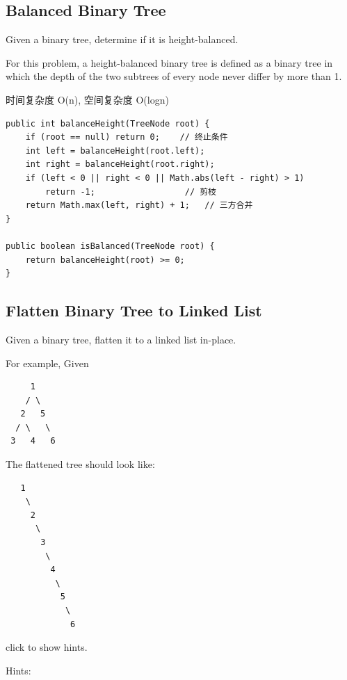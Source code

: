 \documentclass[12pt]{book}
\begin{document}
\subsection{Balanced Binary Tree}
\label{sec-4-2-10}
Given a binary tree, determine if it is height-balanced.

For this problem, a height-balanced binary tree is defined as a binary tree in which the depth of the two subtrees of every node never differ by more than 1.

时间复杂度 O(n), 空间复杂度 O(logn)

\lstset{language=java,label= ,caption= ,numbers=none}
\begin{lstlisting}
public int balanceHeight(TreeNode root) {
    if (root == null) return 0;    // 终止条件
    int left = balanceHeight(root.left);
    int right = balanceHeight(root.right);
    if (left < 0 || right < 0 || Math.abs(left - right) > 1)
        return -1;                  // 剪枝
    return Math.max(left, right) + 1;   // 三方合并
}
        
public boolean isBalanced(TreeNode root) {
    return balanceHeight(root) >= 0;
}
\end{lstlisting}

\subsection{Flatten Binary Tree to Linked List}
\label{sec-4-2-11}
Given a binary tree, flatten it to a linked list in-place.

For example, Given
\lstset{language=java,label= ,caption= ,numbers=none}
\begin{lstlisting}
     1
    / \
   2   5
  / \   \
 3   4   6
\end{lstlisting}

The flattened tree should look like:
\lstset{language=java,label= ,caption= ,numbers=none}
\begin{lstlisting}
   1
    \
     2
      \
       3
        \
         4
          \
           5
            \
             6
\end{lstlisting}
click to show hints.

Hints:
\end{document}
